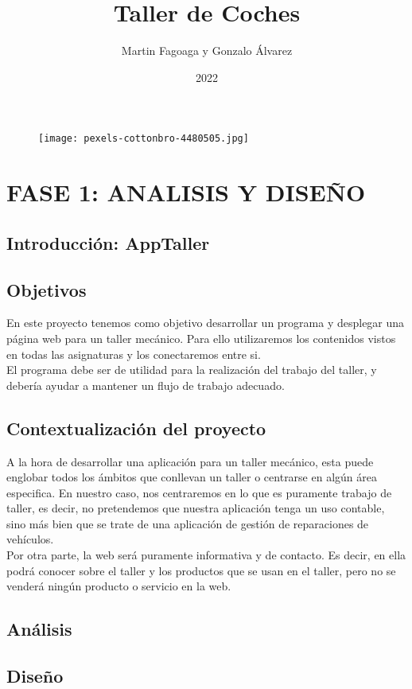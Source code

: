 \documentclass{article}
\title{Taller de Coches}
\author{Martin Fagoaga y Gonzalo Álvarez}
\date{2022}
\begin{document}
\maketitle 
\begin{figure}[H]
  \centering
  \texttt{[image: pexels-cottonbro-4480505.jpg]}
\end{figure}
\clearpage

{
  \hypersetup{ linkcolor=black}
  \tableofcontents
\clearpage
\listoffigures
\clearpage
\clearpage
\lstlistoflistings
\clearpage
}

\section{FASE 1: ANALISIS Y DISEÑO}
\subsection{Introducción: AppTaller}
\subsection{Objetivos}
En este proyecto tenemos como objetivo desarrollar un programa y desplegar una página web para un taller mecánico.
Para ello utilizaremos los contenidos vistos en todas las asignaturas y los conectaremos entre si.\\
El programa debe ser de utilidad para la realización del trabajo del taller, y debería ayudar a mantener un flujo de 
trabajo adecuado.
\subsection{Contextualización del proyecto}
A la hora de desarrollar una aplicación para un taller mecánico, esta puede englobar todos los ámbitos que conllevan
un taller o centrarse en algún área especifica. En nuestro caso, nos centraremos en lo que es puramente trabajo de taller,
es decir, no pretendemos que nuestra aplicación tenga un uso contable, sino más bien que se trate de una aplicación de 
gestión de reparaciones de vehículos.\\
Por otra parte, la web será puramente informativa y de contacto. Es decir, en ella podrá conocer sobre el taller y los productos que se usan
en el taller, pero no se venderá ningún producto o servicio en la web.
\subsection{Análisis}
\subsection{Diseño} 
\end{document}
